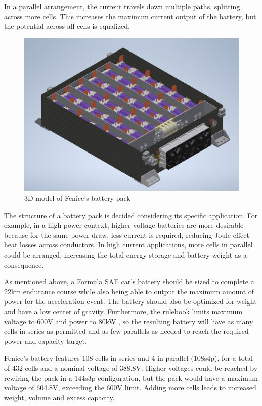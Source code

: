 In a parallel arrangement, the current travels down multiple paths, splitting across more cells. This increases the maximum current output of the battery, but the potential across all cells is equalized.
\begin{figure}[h]
    \centering
    \includegraphics[scale=0.4]{pictures/pack.png}
    \caption{3D model of Fenice's battery pack}
    \label{fig:pack}
\end{figure}
The structure of a battery pack is decided considering its specific application. For example, in a high power context, higher voltage batteries are more desirable because for the same power draw, less current is required, reducing Joule effect heat losses across conductors. In high current applications, more cells in parallel could be arranged, increasing the total energy storage and battery weight as a consequence.

As mentioned above, a Formula SAE car's battery should be sized to complete a 22km endurance course while also being able to output the maximum amount of power for the acceleration event. The battery should also be optimized for weight and have a low center of gravity. Furthermore, the rulebook limits maximum voltage to 600V \cite[EV 4.1.1]{fsg2020} and power to 80kW \cite[EV 2.2.1]{fsg2020}, so the resulting battery will have as many cells in series as permitted and as few parallels as needed to reach the required power and capacity target.

Fenice's battery features 108 cells in series and 4 in parallel (108s4p), for a total of 432 cells and a nominal voltage of 388.8V. Higher voltages could be reached by rewiring the pack in a 144s3p configuration, but the pack would have a maximum voltage of 604.8V, exceeding the 600V limit. Adding more cells leads to increased weight, volume and excess capacity.

